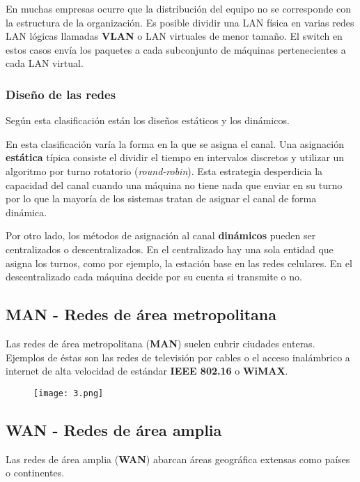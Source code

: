 \documentclass{book}
\begin{document}
	En muchas empresas ocurre que la distribución del equipo no se corresponde con la estructura de la organización. Es posible dividir una LAN física en varias redes LAN lógicas llamadas \textbf{VLAN} o LAN virtuales de menor tamaño. El switch en estos casos envía los paquetes a cada subconjunto de máquinas pertenecientes a cada LAN virtual.
	
	\subsubsection{Diseño de las redes} Según esta clasificación están los diseños estáticos y los dinámicos.
	
	\vspace{3mm}
	En esta clasificación varía la forma en la que se asigna el canal. Una asignación \textbf{estática} típica consiste el dividir el tiempo en intervalos discretos y utilizar un algoritmo por turno rotatorio (\textit{round-robin}). Esta estrategia desperdicia la capacidad del canal cuando una máquina no tiene nada que enviar en su turno por lo que la mayoría de los sistemas tratan de asignar el canal de forma dinámica.
	
	\vspace{3mm}
	Por otro lado, los métodos de asignación al canal \textbf{dinámicos} pueden ser centralizados o descentralizados. En el centralizado hay una sola entidad que asigna los turnos, como por ejemplo, la estación base en las redes celulares. En el descentralizado cada máquina decide por su cuenta si transmite o no.
	
	\subsection{MAN - Redes de área metropolitana}
	Las redes de área metropolitana (\textbf{MAN}) suelen cubrir ciudades enteras. Ejemplos de éstas son las redes de televisión por cables o el acceso inalámbrico a internet de alta velocidad de estándar \textbf{IEEE 802.16} o \textbf{WiMAX}.
	
	\begin{figure}[H]
		\centering
		\texttt{[image: 3.png]}
	\end{figure}
	
	\subsection{WAN - Redes de área amplia}
	Las redes de área amplia (\textbf{WAN}) abarcan áreas geográfica extensas como países o continentes.
	
\end{document}
